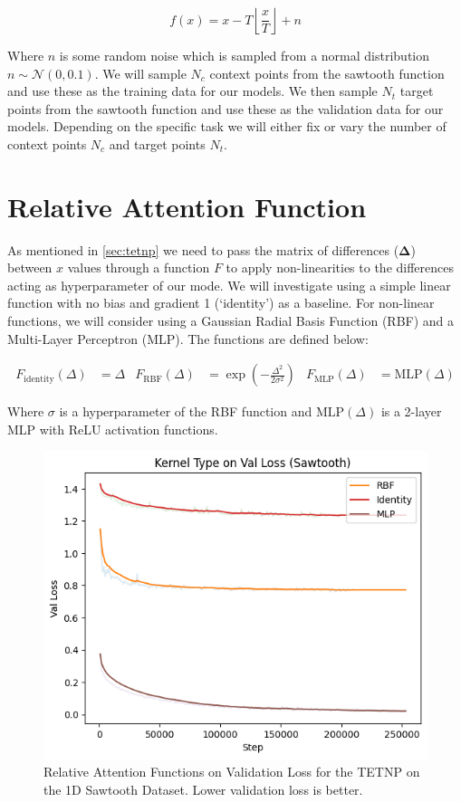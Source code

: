 \documentclass[../../main.tex]{subfiles}
\begin{document}
\begin{equation}
	f(x) = x - T \left\lfloor \frac{x}{T} \right\rfloor + n
\end{equation}

Where $n$ is some random noise which is sampled from a normal distribution $n \sim \mathcal{N}(0, 0.1)$.
We will sample $N_c$ context points from the sawtooth function and use these as the training data for our models. We then sample $N_t$ target points from the sawtooth function and use these as the validation data for our models. Depending on the specific task we will either fix or vary the number of context points $N_c$ and target points $N_t$.


\section{Relative Attention Function}

As mentioned in \autoref{sec:tetnp} we need to pass the matrix of differences ($\bm{\Delta}$) between $x$ values through a function $F$ to apply non-linearities to the differences acting as hyperparameter of our mode. We will investigate using a simple linear function with no bias and gradient 1 (`identity') as a baseline. For non-linear functions, we will consider using a Gaussian Radial Basis Function (RBF) and a Multi-Layer Perceptron (MLP). The functions are defined below:

\begin{align}
	F_{\text{identity}}(\Delta) &= \Delta&
	F_{\text{RBF}}(\Delta) &= \exp\left(-\frac{\Delta^2}{2\sigma^2}\right)&
	F_{\text{MLP}}(\Delta) &= \text{MLP}(\Delta)
\end{align}

Where $\sigma$ is a hyperparameter of the RBF function and $\text{MLP}(\Delta)$ is a 2-layer MLP with ReLU activation functions.

\begin{figure}[H]
	\centering
	\includegraphics[width=0.6\linewidth]{./function.png}
	\caption{Relative Attention Functions on Validation Loss for the TETNP on the 1D Sawtooth Dataset. Lower validation loss is better.}
	\label{fig:relative-attn-func-1d}
\end{figure}
\end{document}
